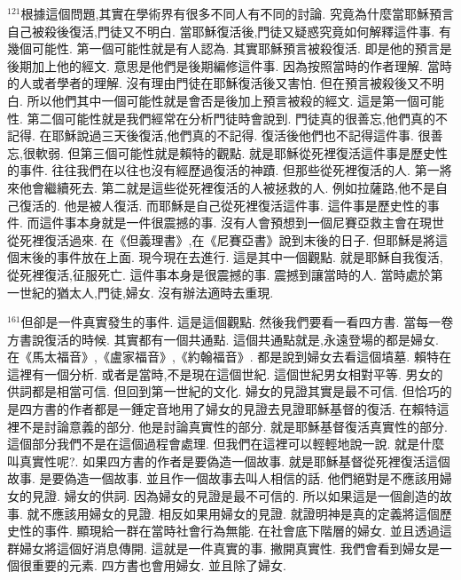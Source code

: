 \documentclass{book}
\begin{document}
$^{121}$根據這個問題,其實在學術界有很多不同人有不同的討論.
究竟為什麼當耶穌預言自己被殺後復活,門徒又不明白.
當耶穌復活後,門徒又疑惑究竟如何解釋這件事.
有幾個可能性.
第一個可能性就是有人認為.
其實耶穌預言被殺復活.
即是他的預言是後期加上他的經文.
意思是他們是後期編修這件事.
因為按照當時的作者理解.
當時的人或者學者的理解.
沒有理由門徒在耶穌復活後又害怕.
但在預言被殺後又不明白.
所以他們其中一個可能性就是會否是後加上預言被殺的經文.
這是第一個可能性.
第二個可能性就是我們經常在分析門徒時會說到.
門徒真的很善忘,他們真的不記得.
在耶穌說過三天後復活,他們真的不記得.
復活後他們也不記得這件事.
很善忘,很軟弱.
但第三個可能性就是賴特的觀點.
就是耶穌從死裡復活這件事是歷史性的事件.
往往我們在以往也沒有經歷過復活的神蹟.
但那些從死裡復活的人.
第一將來他會繼續死去.
第二就是這些從死裡復活的人被拯救的人.
例如拉薩路,他不是自己復活的.
他是被人復活.
而耶穌是自己從死裡復活這件事.
這件事是歷史性的事件.
而這件事本身就是一件很震撼的事.
沒有人會預想到一個尼賽亞救主會在現世從死裡復活過來.
在《但義理書》,在《尼賽亞書》說到末後的日子.
但耶穌是將這個末後的事件放在上面.
現今現在去進行.
這是其中一個觀點.
就是耶穌自我復活,從死裡復活,征服死亡.
這件事本身是很震撼的事.
震撼到讓當時的人.
當時處於第一世紀的猶太人,門徒,婦女.
沒有辦法適時去重現.

$^{161}$但卻是一件真實發生的事件.
這是這個觀點.
然後我們要看一看四方書.
當每一卷方書說復活的時候.
其實都有一個共通點.
這個共通點就是,永遠登場的都是婦女.
在《馬太福音》,《盧家福音》,《約翰福音》.
都是說到婦女去看這個墳墓.
賴特在這裡有一個分析.
或者是當時,不是現在這個世紀.
這個世紀男女相對平等.
男女的供詞都是相當可信.
但回到第一世紀的文化.
婦女的見證其實是最不可信.
但恰巧的是四方書的作者都是一錘定音地用了婦女的見證去見證耶穌基督的復活.
在賴特這裡不是討論意義的部分.
他是討論真實性的部分.
就是耶穌基督復活真實性的部分.
這個部分我們不是在這個過程會處理.
但我們在這裡可以輕輕地說一說.
就是什麼叫真實性呢?.
如果四方書的作者是要偽造一個故事.
就是耶穌基督從死裡復活這個故事.
是要偽造一個故事.
並且作一個故事去叫人相信的話.
他們絕對是不應該用婦女的見證.
婦女的供詞.
因為婦女的見證是最不可信的.
所以如果這是一個創造的故事.
就不應該用婦女的見證.
相反如果用婦女的見證.
就證明神是真的定義將這個歷史性的事件.
顯現給一群在當時社會行為無能.
在社會底下階層的婦女.
並且透過這群婦女將這個好消息傳開.
這就是一件真實的事.
撇開真實性.
我們會看到婦女是一個很重要的元素.
四方書也會用婦女.
並且除了婦女.
\end{document}
